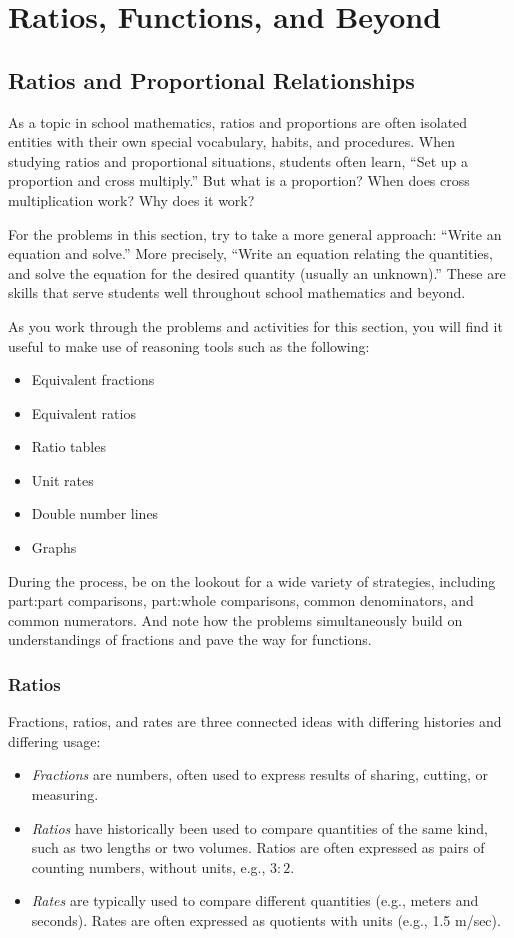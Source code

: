 \chapter{Ratios, Functions, and Beyond}

\section{Ratios and Proportional Relationships}
As a topic in school mathematics, ratios and proportions are often isolated entities with their own special vocabulary, habits, and procedures.  When studying ratios and proportional situations, students often learn, ``Set up a proportion and cross multiply.''   But what is a proportion?  When does cross multiplication work?  Why does it work?  

For the problems in this section, try to take a more general approach:  ``Write an equation and solve.''  More precisely, ``Write an equation relating the quantities, and solve the equation for the desired quantity (usually an unknown).''  These are skills that serve students well throughout school mathematics and beyond.  

As you work through the problems and activities for this section, you will find it useful to make use of reasoning tools such as the following:  
\begin{itemize}
\item Equivalent fractions
\item Equivalent ratios
\item Ratio tables
\item Unit rates
\item Double number lines
\item Graphs
\end{itemize}

During the process, be on the lookout for a wide variety of strategies, including part:part comparisons, part:whole comparisons, common denominators, and common numerators.  And note how the problems simultaneously build on understandings of fractions and pave the way for functions.  

\subsection{Ratios}
Fractions, ratios, and rates are three connected ideas with differing histories and differing usage: 
\begin{itemize} 
\item \emph{Fractions} are numbers, often used to express results of sharing, cutting, or measuring.  
\item \emph{Ratios} have historically been used to compare quantities of the same kind, such as two lengths or two volumes.  Ratios are often expressed as pairs of counting numbers, without units, e.g., $3:2$.  
\item \emph{Rates} are typically used to compare different quantities (e.g., meters and seconds).  Rates are often expressed as quotients with units (e.g., 1.5 m/sec).  
\end{itemize} 

